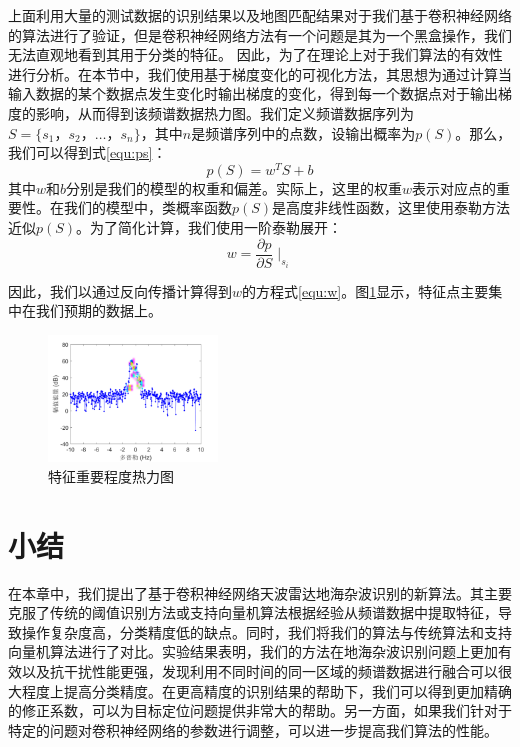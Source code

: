 上面利用大量的测试数据的识别结果以及地图匹配结果对于我们基于卷积神经网络的算法进行了验证，但是卷积神经网络方法有一个问题是其为一个黑盒操作，我们无法直观地看到其用于分类的特征。
因此，为了在理论上对于我们算法的有效性进行分析。在本节中，我们使用基于梯度变化的可视化方法，其思想为通过计算当输入数据的某个数据点发生变化时输出梯度的变化，得到每一个数据点对于输出梯度的影响，从而得到该频谱数据热力图。我们定义频谱数据序列为$ S = \{s_1， s_2， \dots， s_n\} $，其中$n$是频谱序列中的点数，设输出概率为$p(S)$。那么，我们可以得到式\ref{equ:ps}：
\begin{equation}
	p(S) = w^TS+b
	\label{equ:ps}
\end{equation}
其中$ w $和$ b $分别是我们的模型的权重和偏差。实际上，这里的权重$ w $表示对应点的重要性。在我们的模型中，类概率函数$p(S)$是高度非线性函数，这里使用泰勒方法近似$p(S)$。为了简化计算，我们使用一阶泰勒展开：
\begin{equation}
	w = \frac{\partial{p}}{\partial{S}}{\mid}_{s_i}
	\label{equ:w}
\end{equation}

因此，我们以通过反向传播计算得到$ w $的方程式\ref{equ:w}。图\ref{fig:vis}显示，特征点主要集中在我们预期的数据上。
\begin{figure}[H]
	\centering
	\includegraphics[width=0.4\textwidth]{figures/othr/heatmap}
	\caption{特征重要程度热力图}
	\label{fig:vis}
\end{figure}


\section{小结}
在本章中，我们提出了基于卷积神经网络天波雷达地海杂波识别的新算法。其主要克服了传统的阈值识别方法或支持向量机算法根据经验从频谱数据中提取特征，导致操作复杂度高，分类精度低的缺点。同时，我们将我们的算法与传统算法和支持向量机算法进行了对比。实验结果表明，我们的方法在地海杂波识别问题上更加有效以及抗干扰性能更强，发现利用不同时间的同一区域的频谱数据进行融合可以很大程度上提高分类精度。在更高精度的识别结果的帮助下，我们可以得到更加精确的修正系数，可以为目标定位问题提供非常大的帮助。另一方面，如果我们针对于特定的问题对卷积神经网络的参数进行调整，可以进一步提高我们算法的性能。

